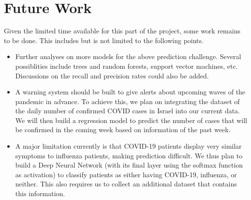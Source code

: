 \documentclass[a4paper]{article}
\begin{document}
\section*{Future Work}
Given the limited time available for this part of the project, some work remains to be done. This includes but is not limited to the following points.
\begin{itemize}
  \item Further analyses on more models for the above prediction challenge. Several possiblities include trees and random forests,  support vector machines, etc. Discussions on the recall and precision rates could also be added.
  \item A warning system should be built to give alerts about upcoming waves of the pandemic in advance. To achieve this, we plan on integrating the dataset of the daily number of confirmed COVID cases in Israel into our current data. We will then build a regression model to predict the number of cases that will be confirmed in the coming week based on information of the past week.
  \item A major limitation currently is that COVID-19 patients display very similar symptoms to influenza patients, making prediction difficult. We thus plan to build a Deep Neural Network (with its final layer using the softmax function as activation) to classify patients as either having COVID-19, influenza, or neither. This also requires us to collect an additional dataset that contains this information.
\end{itemize}

\printbibliography
\end{document}
